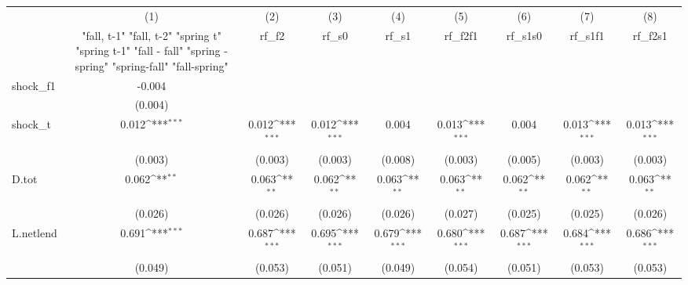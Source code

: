 {
\def\sym#1{\ifmmode^{#1}\else\(^{#1}\)\fi}
\begin{tabular}{l*{8}{c}}
\toprule
            &\multicolumn{1}{c}{(1)}&\multicolumn{1}{c}{(2)}&\multicolumn{1}{c}{(3)}&\multicolumn{1}{c}{(4)}&\multicolumn{1}{c}{(5)}&\multicolumn{1}{c}{(6)}&\multicolumn{1}{c}{(7)}&\multicolumn{1}{c}{(8)}\\
            &\multicolumn{1}{c}{  "fall, t-1" "fall, t-2" "spring t" "spring t-1"  "fall - fall" "spring - spring" "spring-fall" "fall-spring" }&\multicolumn{1}{c}{rf\_f2}&\multicolumn{1}{c}{rf\_s0}&\multicolumn{1}{c}{rf\_s1}&\multicolumn{1}{c}{rf\_f2f1}&\multicolumn{1}{c}{rf\_s1s0}&\multicolumn{1}{c}{rf\_s1f1}&\multicolumn{1}{c}{rf\_f2s1}\\
\midrule
shock\_f1    &      -0.004         &                     &                     &                     &                     &                     &                     &                     \\
            &     (0.004)         &                     &                     &                     &                     &                     &                     &                     \\
\addlinespace
shock\_t     &       0.012\sym{***}&       0.012\sym{***}&       0.012\sym{***}&       0.004         &       0.013\sym{***}&       0.004         &       0.013\sym{***}&       0.013\sym{***}\\
            &     (0.003)         &     (0.003)         &     (0.003)         &     (0.008)         &     (0.003)         &     (0.005)         &     (0.003)         &     (0.003)         \\
\addlinespace
D.tot       &       0.062\sym{**} &       0.063\sym{**} &       0.062\sym{**} &       0.063\sym{**} &       0.063\sym{**} &       0.062\sym{**} &       0.062\sym{**} &       0.063\sym{**} \\
            &     (0.026)         &     (0.026)         &     (0.026)         &     (0.026)         &     (0.027)         &     (0.025)         &     (0.025)         &     (0.026)         \\
\addlinespace
L.netlend   &       0.691\sym{***}&       0.687\sym{***}&       0.695\sym{***}&       0.679\sym{***}&       0.680\sym{***}&       0.687\sym{***}&       0.684\sym{***}&       0.686\sym{***}\\
            &     (0.049)         &     (0.053)         &     (0.051)         &     (0.049)         &     (0.054)         &     (0.051)         &     (0.053)         &     (0.053)         \\

\end{tabular}}
